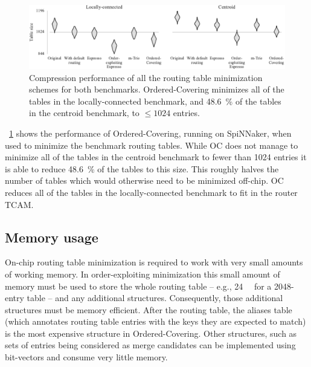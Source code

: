 \documentclass[conference]{IEEEtran}
\begin{document}
\begin{figure}
  \centering
  \includegraphics{experiments/results_esp_and_oc}
  \caption{Compression performance of all the routing table minimization schemes for both benchmarks.
           Ordered-Covering minimizes all of the tables in the locally-connected benchmark, and
           \SI{48.6}{\percent} of the tables in the centroid benchmark, to $\le 1024$ entries.
           }
  \label{fig:results/final}
\end{figure}

  \figurename~\ref{fig:results/final} shows the performance of Ordered-Covering, running on SpiNNaker, when used to minimize the benchmark routing tables.
  While OC does not manage to minimize all of the tables in the centroid benchmark to fewer than 1024 entries it is able to reduce \SI{48.6}{\percent} of the tables to this size.
  This roughly halves the number of tables which would otherwise need to be minimized off-chip.
  OC reduces all of the tables in the locally-connected benchmark to fit in the router TCAM.


  \subsection{Memory usage}


  On-chip routing table minimization is required to work with very small amounts of working memory.
  In order-exploiting minimization this small amount of memory must be used to store the whole routing table -- e.g., \SI{24}{\kibi\byte} for a 2048-entry table -- and any additional structures.
  Consequently, those additional structures must be memory efficient.
  After the routing table, the aliases table (which annotates routing table entries with the keys they are expected to match) is the most expensive structure in Ordered-Covering.
  Other structures, such as sets of entries being considered as merge candidates can be implemented using bit-vectors and consume very little memory.
\end{document}
